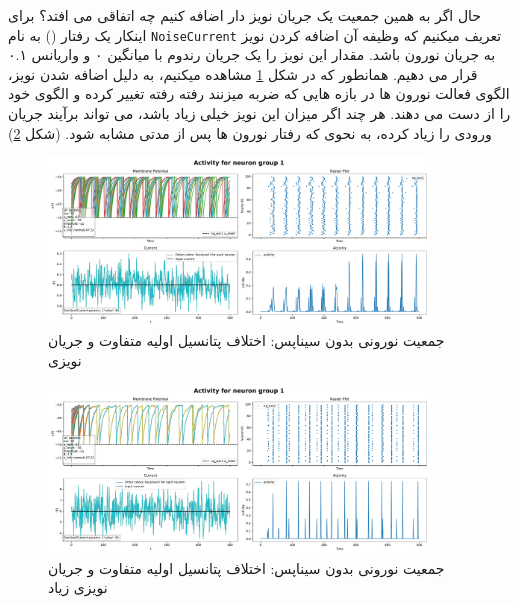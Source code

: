         حال اگر به همین جمعیت یک جریان نویز دار اضافه کنیم چه اتفاقی می افتد؟ برای اینکار یک رفتار
        ()
        به نام 
        \texttt{NoiseCurrent}
        تعریف میکنیم که وظیفه آن اضافه کردن نویز به جریان نورون باشد. مقدار این نویز را یک جریان رندوم با میانگین ۰ و واریانس ۰.۱ قرار می دهیم. همانطور که در شکل 
        \ref{fig:part1-simple-ng-u-init-noise-curr}
        مشاهده میکنیم، به دلیل اضافه شدن نویز، الگوی فعالت نورون ها در بازه هایی که ضربه میزنند رفته رفته تغییر کرده و الگوی خود را از دست می دهند. هر چند اگر میزان این نویز خیلی زیاد باشد، می تواند برآیند جریان ورودی را زیاد کرده، به نحوی که رفتار نورون ها پس از مدتی مشابه شود.
        (شکل \ref{fig:part1-simple-ng-u-init-high-noise-curr})
        \begin{figure}[!ht]
            \centering
            \includegraphics[width=0.9\textwidth]{plots/part1-Simple-ng-without-synapse-noise-curr.pdf} 
            \caption{جمعیت نورونی بدون سیناپس: اختلاف پتانسیل اولیه متفاوت و جریان نویزی}
            \label{fig:part1-simple-ng-u-init-noise-curr}
        \end{figure}
        \begin{figure}[!ht]
            \centering
            \includegraphics[width=0.9\textwidth]{plots/part1-Simple-ng-without-synapse-high-noise-curr.pdf} 
            \caption{جمعیت نورونی بدون سیناپس: اختلاف پتانسیل اولیه متفاوت و جریان نویزی زیاد}
            \label{fig:part1-simple-ng-u-init-high-noise-curr}
        \end{figure}

